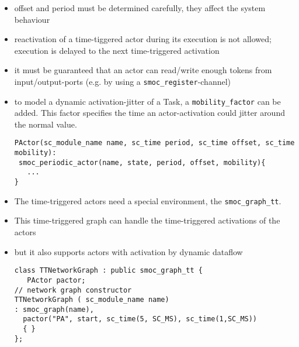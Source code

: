 \begin{frame}[fragile=singleslide]
\begin{itemize}
\item offset and period must be determined carefully, they affect the system behaviour
\item reactivation of a time-tiggered actor during its execution is not allowed; execution is delayed to the next time-triggered activation
\item it must be guaranteed that an actor can read/write enough tokens from input/output-ports (e.g. by using a \lstinline{smoc_register}-channel)
\item to model a dynamic activation-jitter of a Task, a \lstinline{mobility_factor} can be added. This factor specifies the time an actor-activation could jitter around the normal value.
\begin{lstlisting}
PActor(sc_module_name name, sc_time period, sc_time offset, sc_time mobility):
 smoc_periodic_actor(name, state, period, offset, mobility){
   ...
}
\end{lstlisting}
\end{itemize}
\end{frame}




\begin{frame}[fragile=singleslide]
\begin{itemize}
\item The time-triggered actors need a special environment, the \lstinline{smoc_graph_tt}.
\item This time-triggered graph can handle the time-triggered activations of the actors
\item but it also supports actors with activation by dynamic dataflow
\begin{lstlisting}
class TTNetworkGraph : public smoc_graph_tt {
   PActor pactor;
// network graph constructor
TTNetworkGraph ( sc_module_name name)
: smoc_graph(name),
  pactor("PA", start, sc_time(5, SC_MS), sc_time(1,SC_MS))
  { }
};
\end{lstlisting}
\end{itemize}
\end{frame}




